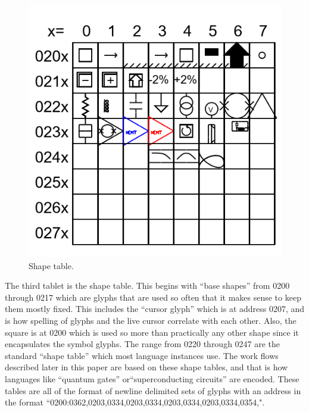 \documentclass[11pt]{article}
\begin{document}
\begin{figure}

\includegraphics[width=\linewidth]{figures/figure5_shapetable.png}

\caption{Shape table.}
\end{figure}

    The third tablet is the shape table.   This begins with ``base shapes'' from 0200 through 0217 which are glyphs that are used so often that it makes sense to keep them mostly fixed.  This includes the ``cursor glyph'' which is at address 0207, and is how spelling of glyphs and the live cursor correlate with each other.  Also, the square is at 0200 which is used so more than practically any other shape since it encapsulates the symbol glyphs.  The range from 0220 through 0247 are the standard ``shape table'' which most language instances use.  The work flows described later in this paper are based on these shape tables, and that is how languages like ``quantum gates'' or``superconducting circuits'' are encoded.  These tables are all of the format of newline delimited sets of glyphs with an address in the format ``0200:0362,0203,0334,0203,0334,0203,0334,0203,0334,0354,".  
\end{document}

